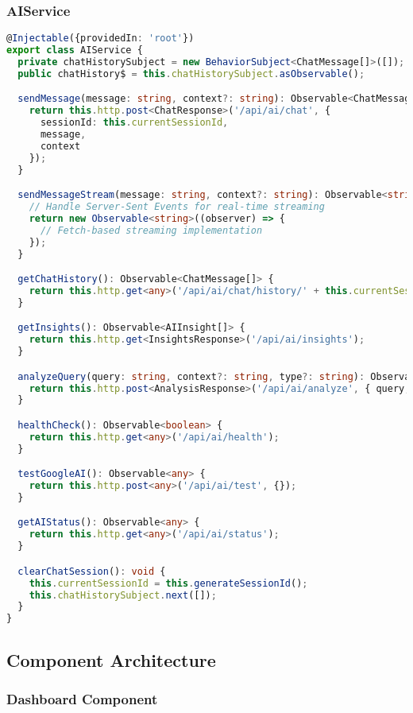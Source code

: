 \documentclass[11pt,a4paper]{article}
\begin{document}
\subsubsection{AIService}

\begin{lstlisting}[language=typescript, caption=AI Service]
@Injectable({providedIn: 'root'})
export class AIService {
  private chatHistorySubject = new BehaviorSubject<ChatMessage[]>([]);
  public chatHistory$ = this.chatHistorySubject.asObservable();

  sendMessage(message: string, context?: string): Observable<ChatMessage> {
    return this.http.post<ChatResponse>('/api/ai/chat', {
      sessionId: this.currentSessionId,
      message,
      context
    });
  }

  sendMessageStream(message: string, context?: string): Observable<string> {
    // Handle Server-Sent Events for real-time streaming
    return new Observable<string>((observer) => {
      // Fetch-based streaming implementation
    });
  }

  getChatHistory(): Observable<ChatMessage[]> {
    return this.http.get<any>('/api/ai/chat/history/' + this.currentSessionId);
  }

  getInsights(): Observable<AIInsight[]> {
    return this.http.get<InsightsResponse>('/api/ai/insights');
  }

  analyzeQuery(query: string, context?: string, type?: string): Observable<AnalysisResponse> {
    return this.http.post<AnalysisResponse>('/api/ai/analyze', { query, context, type });
  }

  healthCheck(): Observable<boolean> {
    return this.http.get<any>('/api/ai/health');
  }

  testGoogleAI(): Observable<any> {
    return this.http.post<any>('/api/ai/test', {});
  }

  getAIStatus(): Observable<any> {
    return this.http.get<any>('/api/ai/status');
  }

  clearChatSession(): void {
    this.currentSessionId = this.generateSessionId();
    this.chatHistorySubject.next([]);
  }
}
\end{lstlisting}

\subsection{Component Architecture}

\subsubsection{Dashboard Component}
\end{document}
